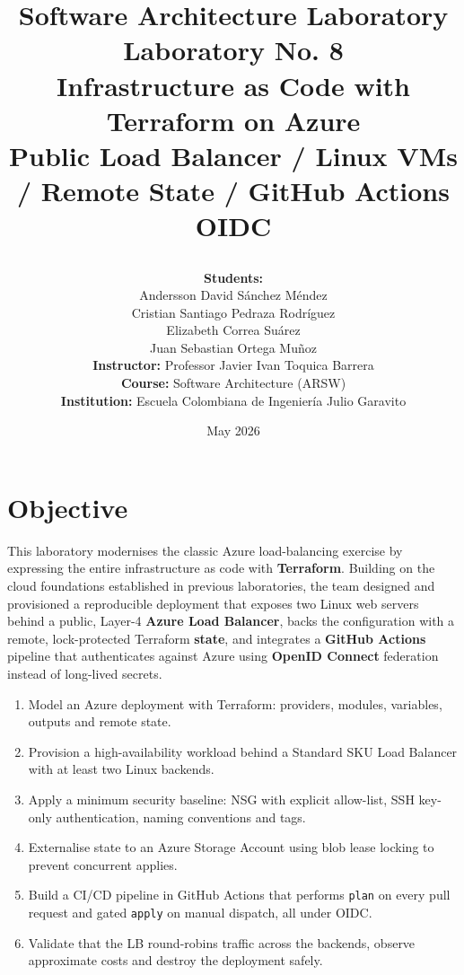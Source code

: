 \documentclass[10pt,a4paper,twocolumn]{article}
\title{\vspace{-1cm}
    \begin{center}
        \imgplaceholder{3cm}{media/university_logo.png}
    \end{center}
    \vspace{1.5cm}
    \textbf{\Large Software Architecture Laboratory}\\
    \vspace{1cm}
    \textbf{\huge Laboratory No. 8}\\
    \textbf{\huge Infrastructure as Code with Terraform on Azure}\\
    \vspace{1.5cm}
    \large Public Load Balancer / Linux VMs / Remote State / GitHub Actions OIDC
}
\author{
    \vspace{2cm}
    \textbf{Students:}\\[0.05cm]
    Andersson David S\'{a}nchez M\'{e}ndez\\[0.3cm]
    Cristian Santiago Pedraza Rodr\'{i}guez\\[0.3cm]
    Elizabeth Correa Su\'{a}rez\\[0.3cm]
    Juan Sebastian Ortega Mu\~{n}oz\\[1.5cm]
    \textbf{Instructor:} Professor Javier Ivan Toquica Barrera\\[0.5cm]
    \textbf{Course:} Software Architecture (ARSW)\\[0.3cm]
    \textbf{Institution:} Escuela Colombiana de Ingenier\'{i}a Julio Garavito\\[2cm]
}
\date{May 2026}
\begin{document}
\onecolumn
\maketitle
\thispagestyle{empty}
\newpage

\tableofcontents
\newpage

\twocolumn

\section{Objective}

This laboratory modernises the classic Azure load-balancing exercise by
expressing the entire infrastructure as code with \textbf{Terraform}.
Building on the cloud foundations established in previous laboratories,
the team designed and provisioned a reproducible deployment that exposes
two Linux web servers behind a public, Layer-4 \textbf{Azure Load Balancer},
backs the configuration with a remote, lock-protected Terraform
\textbf{state}, and integrates a \textbf{GitHub Actions} pipeline that
authenticates against Azure using \textbf{OpenID Connect} federation
instead of long-lived secrets.

\begin{conceptbox}[title={Lab \#8 Objectives}]
\begin{enumerate}
  \item Model an Azure deployment with Terraform: providers, modules,
        variables, outputs and remote state.
  \item Provision a high-availability workload behind a Standard SKU
        Load Balancer with at least two Linux backends.
  \item Apply a minimum security baseline: NSG with explicit allow-list,
        SSH key-only authentication, naming conventions and tags.
  \item Externalise state to an Azure Storage Account using blob lease
        locking to prevent concurrent applies.
  \item Build a CI/CD pipeline in GitHub Actions that performs
        \texttt{plan} on every pull request and gated \texttt{apply} on
        manual dispatch, all under OIDC.
  \item Validate that the LB round-robins traffic across the backends,
        observe approximate costs and destroy the deployment safely.
\end{enumerate}
\end{conceptbox}
\end{document}

